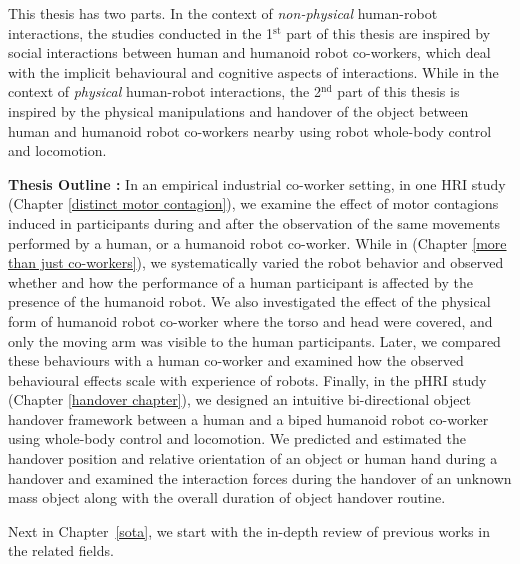 This thesis has two parts. In the context of \textit{non-physical} human-robot interactions, the studies conducted in the 1$^\text{st}$ part of this thesis are inspired by social interactions between human and humanoid robot co-workers, which deal with the implicit behavioural and cognitive aspects of interactions. While in the context of \textit{physical} human-robot interactions, the 2$^\text{nd}$ part of this thesis is inspired by the physical manipulations and handover of the object between human and humanoid robot co-workers nearby using robot whole-body control and locomotion.


\textbf{Thesis Outline :} In an empirical industrial co-worker setting, in one HRI study (Chapter \ref{distinct motor contagion}), we examine the effect of motor contagions induced in participants during and after the observation of the same movements performed by a human, or a humanoid robot co-worker. While in (Chapter \ref{more than just co-workers}), we systematically varied the robot behavior and observed whether and how the performance of a human participant is affected by the presence of the humanoid robot. We also investigated the effect of the physical form of humanoid robot co-worker where the torso and head were covered, and only the moving arm was visible to the human participants. Later, we compared these behaviours with a human co-worker and examined how the observed behavioural effects scale with experience of robots. Finally, in the pHRI study (Chapter \ref{handover chapter}), we designed an intuitive bi-directional object handover framework between a human and a biped humanoid robot co-worker using whole-body control and locomotion. We predicted and estimated the handover position and relative orientation of an object or human hand during a handover and examined the interaction forces during the handover of an unknown mass object along with the overall duration of object handover routine.

Next in Chapter~\ref{sota}, we start with the in-depth review of previous works in the related fields.



\clearpage %
\pagestyle{fancy}